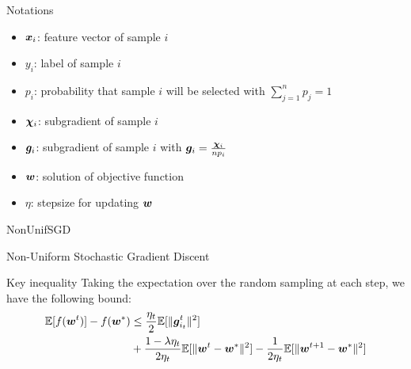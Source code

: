 \begin{frame}{Notations}
\begin{itemize}
\item $\bm{x}_i$: feature vector of sample $i$
\item $y_i$: label of sample $i$
\item $p_i$: probability that sample $i$ will be selected with $\sum_{j=1}^n p_j=1$
\item $\bm{\chi}_i$: subgradient of sample $i$
\item $\bm{g}_i$: subgradient of sample $i$ with $\bm{g}_i = \frac{\bm{\chi}_i}{n p_i}$
\item $\bm{w}$: solution of objective function
\item $\eta$: stepsize for updating $\bm{w}$
\end{itemize}
\end{frame}
\begin{frame}{NonUnifSGD}
\begin{algorithm}[H]
    \label{alg:SGD}
    \caption{Non-Uniform Stochastic Gradient Discent}
    \SetAlgoLined
\end{algorithm}
\end{frame}

\begin{frame}{Key inequality}
Taking the expectation over the random sampling at each step, we have the following bound:
\begin{align*}\label{neq:fworigin}
     \mathbb{E}[f(\bm{w}^{t})]-f(\bm{w}^*)   &\le  \frac{\eta_t}{2}\mathbb{E}[\|\bm{g}_{i_t}^t\|^2]  \\
    &+\frac{1-\lambda \eta_t}{2\eta_t} \mathbb{E}[\|\bm{w}^{t}-\bm{w}^*\|^2] - \frac{1}{2\eta_t}  \mathbb{E}[\|\bm{w}^{t+1} - \bm{w}^*\|^2]
\end{align*}
\end{frame}


